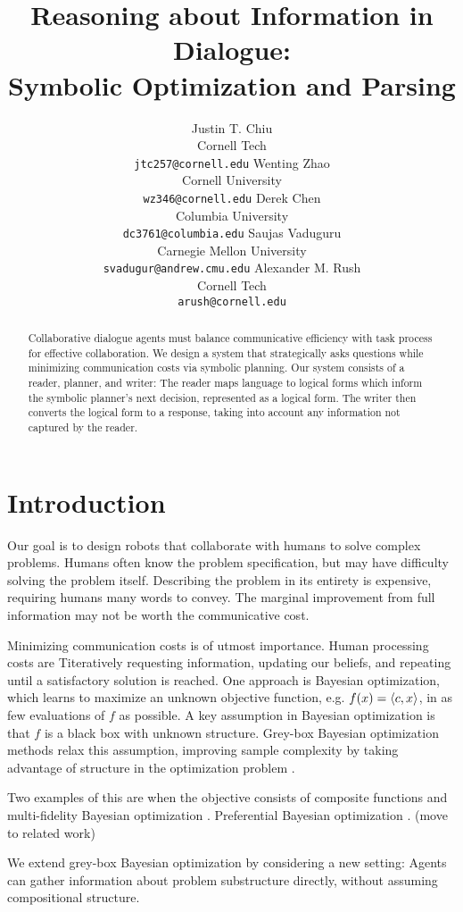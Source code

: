 \documentclass[11pt]{article}
\title{
Reasoning about Information in Dialogue:\\
Symbolic Optimization and Parsing
}
\author{
Justin T. Chiu  \\
Cornell Tech \\
\texttt{jtc257@cornell.edu}
\And
Wenting Zhao \\
Cornell University \\
\texttt{wz346@cornell.edu}
\And
Derek Chen \\
Columbia University \\
\texttt{dc3761@columbia.edu}
\AND
Saujas Vaduguru \\
Carnegie Mellon University \\
\texttt{svadugur@andrew.cmu.edu}
\And
Alexander M. Rush \\
Cornell Tech \\
\texttt{arush@cornell.edu}
}
\begin{document}
\maketitle

\begin{abstract}
Collaborative dialogue agents must balance communicative efficiency with task process for effective collaboration.
We design a system that strategically asks questions while minimizing communication costs via symbolic planning.
Our system consists of a reader, planner, and writer:
The reader maps language to logical forms
which inform the symbolic planner's next decision,
represented as a logical form.
The writer then converts the logical form to a response,
taking into account any information not captured by the reader.

\end{abstract}

\section{Introduction}

Our goal is to design robots that collaborate with humans to solve complex problems.
Humans often know the problem specification, but may have difficulty solving the problem itself.
Describing the problem in its entirety is expensive, requiring humans many words to convey.
The marginal improvement from full information may not be worth the communicative cost.

Minimizing communication costs is of utmost importance.
Human processing costs are 
Titeratively requesting information, updating our beliefs, and repeating until a satisfactory solution is reached.
One approach is Bayesian optimization, which learns to maximize an unknown objective function,
e.g. $f(x) = \left\langle c,x\right\rangle$, in as few evaluations of $f$ as possible.
A key assumption in Bayesian optimization is that $f$ is a black box with unknown structure.
Grey-box Bayesian optimization methods relax this assumption, improving sample complexity by taking advantage of structure in the optimization problem \citep{grey-box-bayesopt}.

Two examples of this are when the objective consists of composite functions \citep{astudillo2019bayesian} and multi-fidelity Bayesian optimization \citep{poloczek2016multiinformation,Zanjani_Foumani_2023}. 
Preferential Bayesian optimization \citep{astudillo2023qeubo}. (move to related work)

We extend grey-box Bayesian optimization by considering a new setting:
Agents can gather information about problem substructure directly, without assuming compositional structure.
\end{document}

